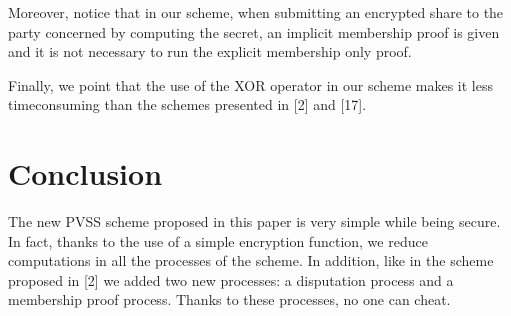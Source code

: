 \documentclass[submission,copyright,creativecommons]{eptcs}
\begin{document}
Moreover, notice that in our scheme, when submitting an encrypted share to
the party concerned by computing the secret, an implicit membership proof is
given and it is not necessary to run the explicit membership only proof.

Finally, we point that the use of the XOR operator in our scheme makes it
less timeconsuming than the schemes presented in [2] and [17].

\section{Conclusion}

The new PVSS scheme proposed in this paper is very simple while being
secure. In fact, thanks to the use of a simple encryption function, we
reduce computations in all the processes of the scheme. In addition, like in
the scheme proposed in [2] we added two new processes: a disputation
process and a membership proof process. Thanks to these processes, no one
can cheat.


\nocite{*}


\end{document}

